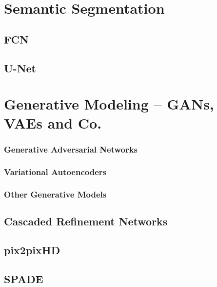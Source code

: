 
\section{Semantic Segmentation}
\subsection{FCN}
\subsection{U-Net} %

\section{Generative Modeling – GANs, VAEs and Co.}

\subsubsection{Generative Adversarial Networks}
\subsubsection{Variational Autoencoders}
\subsubsection{Other Generative Models}


\subsection{Cascaded Refinement Networks}
\subsection{pix2pixHD} 
\subsection{SPADE} 